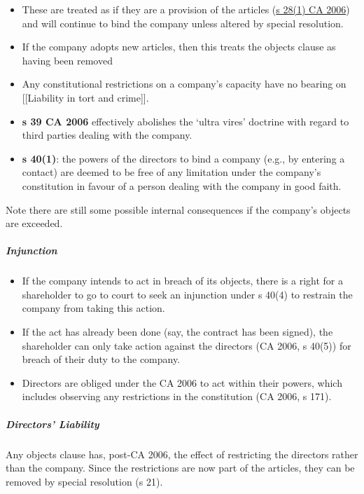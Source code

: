 \documentclass[
]{article}
\providecommand{\tightlist}{%
  \setlength{\itemsep}{0pt}\setlength{\parskip}{0pt}}
\begin{document}
\begin{itemize}
\tightlist
\item
  These are treated as if they are a provision of the articles
  (\href{https://www.legislation.gov.uk/ukpga/2006/46/section/28}{s
  28(1) CA 2006}) and will continue to bind the company unless altered
  by special resolution.
\item
  If the company adopts new articles, then this treats the objects
  clause as having been removed
\item
  Any constitutional restrictions on a company's capacity have no
  bearing on {[}{[}Liability in tort and crime{]}{]}.
\item
  \textbf{s 39 CA 2006} effectively abolishes the `ultra vires' doctrine
  with regard to third parties dealing with the company.
\item
  \textbf{s 40(1)}: the powers of the directors to bind a company (e.g.,
  by entering a contact) are deemed to be free of any limitation under
  the company's constitution in favour of a person dealing with the
  company in good faith.
\end{itemize}

Note there are still some possible internal consequences if the
company's objects are exceeded.

\hypertarget{injunction}{%
\subparagraph{Injunction}\label{injunction}}

\begin{itemize}
\tightlist
\item
  If the company intends to act in breach of its objects, there is a
  right for a shareholder to go to court to seek an injunction under s
  40(4) to restrain the company from taking this action.
\item
  If the act has already been done (say, the contract has been signed),
  the shareholder can only take action against the directors (CA 2006, s
  40(5)) for breach of their duty to the company.
\item
  Directors are obliged under the CA 2006 to act within their powers,
  which includes observing any restrictions in the constitution (CA
  2006, s 171).
\end{itemize}

\hypertarget{directors-liability}{%
\subparagraph{Directors' Liability}\label{directors-liability}}

Any objects clause has, post-CA 2006, the effect of restricting the
directors rather than the company. Since the restrictions are now part
of the articles, they can be removed by special resolution (s 21).
\end{document}
